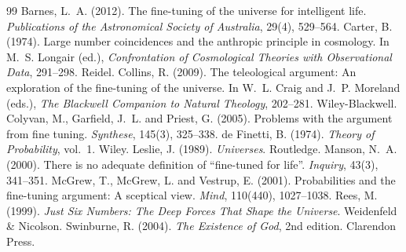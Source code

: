 \documentclass{situationist-preprint}
\begin{document}
\begin{thebibliography}{99}\small
{} Barnes, L.~A. (2012). The fine-tuning of the universe for intelligent life. \emph{Publications of the Astronomical Society of Australia}, 29(4), 529--564.
 Carter, B. (1974). Large number coincidences and the anthropic principle in cosmology. In M.~S. Longair (ed.), \emph{Confrontation of Cosmological Theories with Observational Data}, 291--298. Reidel.
 Collins, R. (2009). The teleological argument: An exploration of the fine-tuning of the universe. In W.~L. Craig and J.~P. Moreland (eds.), \emph{The Blackwell Companion to Natural Theology}, 202--281. Wiley-Blackwell.
 Colyvan, M., Garfield, J.~L. and Priest, G. (2005). Problems with the argument from fine tuning. \emph{Synthese}, 145(3), 325--338.
 de Finetti, B. (1974). \emph{Theory of Probability}, vol.~1. Wiley.
 Leslie, J. (1989). \emph{Universes}. Routledge.
 Manson, N.~A. (2000). There is no adequate definition of \enquote{fine-tuned for life}. \emph{Inquiry}, 43(3), 341--351.
 McGrew, T., McGrew, L. and Vestrup, E. (2001). Probabilities and the fine-tuning argument: A sceptical view. \emph{Mind}, 110(440), 1027--1038.
 Rees, M. (1999). \emph{Just Six Numbers: The Deep Forces That Shape the Universe}. Weidenfeld \& Nicolson.
 Swinburne, R. (2004). \emph{The Existence of God}, 2nd edition. Clarendon Press.
\end{thebibliography}
\end{document}
